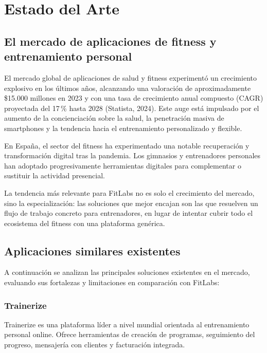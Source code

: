 \chapter{Estado del Arte}

\section{El mercado de aplicaciones de fitness y entrenamiento personal}

El mercado global de aplicaciones de salud y fitness experimentó un crecimiento explosivo en los últimos años, alcanzando una valoración de aproximadamente \$15.000 millones en 2023 y con una tasa de crecimiento anual compuesto (CAGR) proyectada del 17\,\% hasta 2028 (Statista, 2024). Este auge está impulsado por el aumento de la concienciación sobre la salud, la penetración masiva de smartphones y la tendencia hacia el entrenamiento personalizado y flexible.

En España, el sector del fitness ha experimentado una notable recuperación y transformación digital tras la pandemia. Los gimnasios y entrenadores personales han adoptado progresivamente herramientas digitales para complementar o sustituir la actividad presencial.

La tendencia más relevante para FitLabs no es solo el crecimiento del mercado, sino la especialización: las soluciones que mejor encajan son las que resuelven un flujo de trabajo concreto para entrenadores, en lugar de intentar cubrir todo el ecosistema del fitness con una plataforma genérica.

\section{Aplicaciones similares existentes}

A continuación se analizan las principales soluciones existentes en el mercado, evaluando sus fortalezas y limitaciones en comparación con FitLabs:

\subsection{Trainerize}

Trainerize es una plataforma líder a nivel mundial orientada al entrenamiento personal online. Ofrece herramientas de creación de programas, seguimiento del progreso, mensajería con clientes y facturación integrada.

